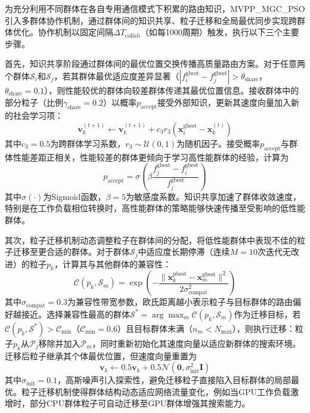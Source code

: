 \documentclass[11pt,a4paper]{article}
\begin{document}
为充分利用不同群体在各自专用通信模式下积累的路由知识，MVPP\_MGC\_PSO引入多群体协作机制，通过群体间的知识共享、粒子迁移和全局最优同步实现跨群体优化。协作机制以固定间隔$\Delta T_{\text{collab}}$（如每1000周期）触发，执行以下三个主要步骤。

首先，知识共享阶段通过群体间的最优位置交换传播高质量路由方案。对于任意两个群体$\mathcal{S}_i$和$\mathcal{S}_j$，若其群体最优适应度差异显著（$|f_i^{\text{gbest}} - f_j^{\text{gbest}}| > \theta_{\text{share}}$，$\theta_{\text{share}} = 0.1$），则性能较优的群体向较差群体传递其最优位置信息。接收群体中的部分粒子（比例$\gamma_{\text{share}} = 0.2$）以概率$p_{\text{accept}}$接受外部知识，更新其速度向量加入新的社会学习项：
\begin{equation}
\mathbf{v}_k^{(t+1)} \leftarrow \mathbf{v}_k^{(t+1)} + c_3 r_3 (\mathbf{x}_i^{\text{gbest}} - \mathbf{x}_k^{(t)})
\end{equation}
其中$c_3 = 0.5$为跨群体学习系数，$r_3 \sim \mathcal{U}(0, 1)$为随机因子。接受概率$p_{\text{accept}}$与群体性能差距正相关，性能较差的群体更倾向于学习高性能群体的经验，计算为
\begin{equation}
p_{\text{accept}} = \sigma\left(\beta \frac{f_j^{\text{gbest}} - f_i^{\text{gbest}}}{f_j^{\text{gbest}}}\right)
\end{equation}
其中$\sigma(\cdot)$为Sigmoid函数，$\beta = 5$为敏感度系数。知识共享加速了群体收敛速度，特别是在工作负载相位转换时，高性能群体的策略能够快速传播至受影响的低性能群体。

其次，粒子迁移机制动态调整粒子在群体间的分配，将低性能群体中表现不佳的粒子迁移至更合适的群体。对于群体$\mathcal{S}_j$中适应度长期停滞（连续$M = 10$次迭代无改进）的粒子$p_k$，计算其与其他群体的兼容性：
\begin{equation}
\mathcal{C}(p_k, \mathcal{S}_m) = \exp\left(-\frac{\|\mathbf{x}_k^{\text{pbest}} - \mathbf{x}_m^{\text{gbest}}\|^2}{2\sigma_{\text{compat}}^2}\right)
\end{equation}
其中$\sigma_{\text{compat}} = 0.3$为兼容性带宽参数，欧氏距离越小表示粒子与目标群体的路由偏好越接近。选择兼容性最高的群体$\mathcal{S}^* = \arg\max_m \mathcal{C}(p_k, \mathcal{S}_m)$作为迁移目标，若$\mathcal{C}(p_k, \mathcal{S}^*) > \mathcal{C}_{\min}$（$\mathcal{C}_{\min} = 0.6$）且目标群体未满（$n_m < N_{\max}$），则执行迁移：粒子$p_k$从$\mathcal{P}_j$移除并加入$\mathcal{P}_m$，同时重新初始化其速度向量以适应新群体的搜索环境。迁移后粒子继承其个体最优位置，但速度向量重置为
\begin{equation}
\mathbf{v}_k \leftarrow 0.5 \mathbf{v}_k + 0.5 \mathcal{N}(\mathbf{0}, \sigma_{\text{init}}^2 \mathbf{I})
\end{equation}
其中$\sigma_{\text{init}} = 0.1$，高斯噪声引入探索性，避免迁移粒子直接陷入目标群体的局部最优。粒子迁移机制使得群体结构动态适应网络流量变化，例如当GPU工作负载激增时，部分CPU群体粒子可自动迁移至GPU群体增强其搜索能力。
\end{document}
